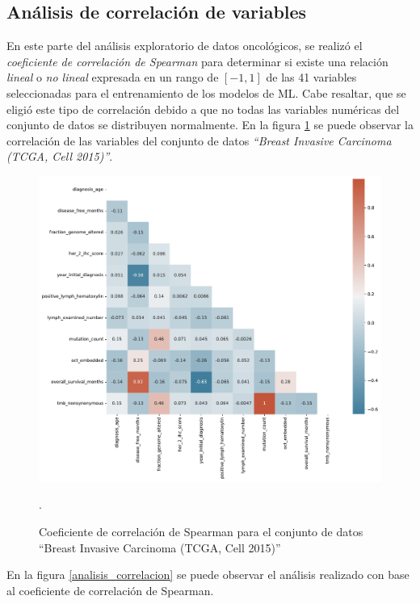 \clearpage	
\newpage
\subsection{Análisis de correlación de variables }
En este parte del análisis exploratorio de datos oncológicos, se realizó el \textit{coeficiente de correlación de Spearman} para determinar si existe una relación \textit{lineal} o \textit{no lineal} expresada en un rango de $[-1,1]$ de las 41 variables seleccionadas para el entrenamiento de los modelos de ML. Cabe resaltar, que se eligió este tipo de correlación debido a que no todas las variables numéricas del conjunto de datos se distribuyen normalmente. En la figura \ref{heatmap} se puede observar la correlación de las variables del conjunto de datos \textit{“Breast Invasive Carcinoma (TCGA, Cell 2015)”}.

\begin{figure}[htb!]
	\centering
	\includegraphics[width=1
	\linewidth]{NOTEBOOK/IMAGENES_CORRELACION/correlacion_spearman}
	\caption{Coeficiente de correlación de Spearman para el conjunto de datos “Breast Invasive Carcinoma (TCGA, Cell 2015)”}.
	\label{heatmap}
\end{figure}

En la figura \ref{analisis_correlacion} se puede observar el análisis realizado con base al coeficiente de correlación de Spearman. 

